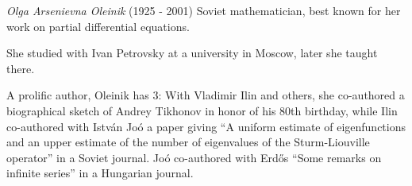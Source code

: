 \documentclass[12pt]{article}
\begin{document}

\emph{Olga Arsenievna Oleinik} (1925 - 2001) Soviet mathematician, best known for her work on partial differential equations.

She studied with Ivan Petrovsky at a university in Moscow, later she taught there.

A prolific author, Oleinik has  3: With Vladimir Ilin and others, she co-authored a biographical sketch of Andrey Tikhonov in honor of his 80th birthday, while Ilin co-authored with Istv\'an Jo\'o a paper giving ``A uniform estimate of eigenfunctions and an upper estimate of the number of eigenvalues of the Sturm-Liouville operator'' in a Soviet journal. Jo\'o co-authored with Erd\H{o}s ``Some remarks on infinite series'' in a Hungarian journal.
\end{document}
